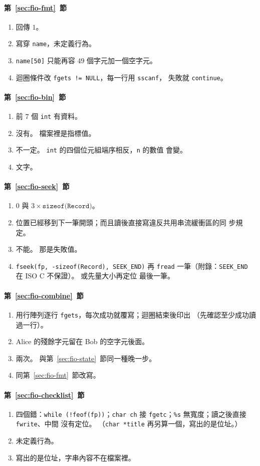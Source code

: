 \paragraph{第~\ref{sec:fio-fmt}~節}
\begin{enumerate}
\item 回傳 $1$。
\item 寫穿 \texttt{name}，未定義行為。
\item \texttt{name[50]} 只能再容 $49$ 個字元加一個空字元。
\item 迴圈條件改 \texttt{fgets != NULL}，每一行用 \texttt{sscanf}，
失敗就 \texttt{continue}。
\end{enumerate}

\paragraph{第~\ref{sec:fio-bin}~節}
\begin{enumerate}
\item 前 $7$ 個 \texttt{int} 有資料。
\item 沒有。 檔案裡是指標值。
\item 不一定。 \texttt{int} 的四個位元組端序相反，\texttt{n} 的數值
會變。
\item 文字。
\end{enumerate}

\paragraph{第~\ref{sec:fio-seek}~節}
\begin{enumerate}
\item $0$ 與 $3 \times \texttt{sizeof(Record)}$。
\item 位置已經移到下一筆開頭；而且讀後直接寫違反共用串流緩衝區的同
步規定。
\item 不能。 那是失敗值。
\item \texttt{fseek(fp, -sizeof(Record), SEEK\_END)} 再 \texttt{fread}
一筆（附錄：\texttt{SEEK\_END} 在 ISO C 不保證）。 或先量大小再定位
最後一筆。
\end{enumerate}

\paragraph{第~\ref{sec:fio-combine}~節}
\begin{enumerate}
\item 用行陣列逐行 \texttt{fgets}，每次成功就覆寫；迴圈結束後印出
（先確認至少成功讀過一行）。
\item Alice 的殘餘字元留在 Bob 的空字元後面。
\item 兩次。 與第~\ref{sec:fio-state}~節同一種晚一步。
\item 同第~\ref{sec:fio-fmt}~節改寫。
\end{enumerate}

\paragraph{第~\ref{sec:fio-checklist}~節}
\begin{enumerate}
\item 四個錯：\texttt{while (!feof(fp))}；\texttt{char ch} 接
\texttt{fgetc}；\texttt{\%s} 無寬度；讀之後直接 \texttt{fwrite}、中間
沒有定位。 （\texttt{char *title} 再另算一個，寫出的是位址。）
\item 未定義行為。
\item 寫出的是位址，字串內容不在檔案裡。
\end{enumerate}
